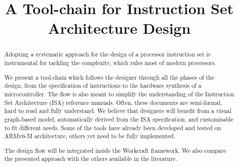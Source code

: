 \documentclass[conference]{IEEEtran}
\begin{document}


\title{A Tool-chain for Instruction Set Architecture Design}

\author{
\and
{}
}

\maketitle

\begin{abstract}
Adopting a systematic approach for the design of a processor instruction set is
instrumental for tackling the complexity, which rules most of modern processors.

We present a tool-chain which follows the designer through all the phases of the
design, from the specification of instructions to the hardware synthesis of a
microcontroller. The flow is also meant to simplify the understanding of the
Instruction Set Architecture (ISA) reference manuals. Often, these documents are
semi-formal, hard to read and fully understand. We believe that designers will
benefit from a visual graph-based model, automatically derived from the ISA
specification, and customisable to fit different needs. Some of the tools have
already been developed and tested on ARMv6-M architecture, others yet need to be
fully implemented.

The design flow will be integrated inside the Workcraft framework. We also compare
the presented approach with the others available in the literature.
\end{abstract}
\end{document}
